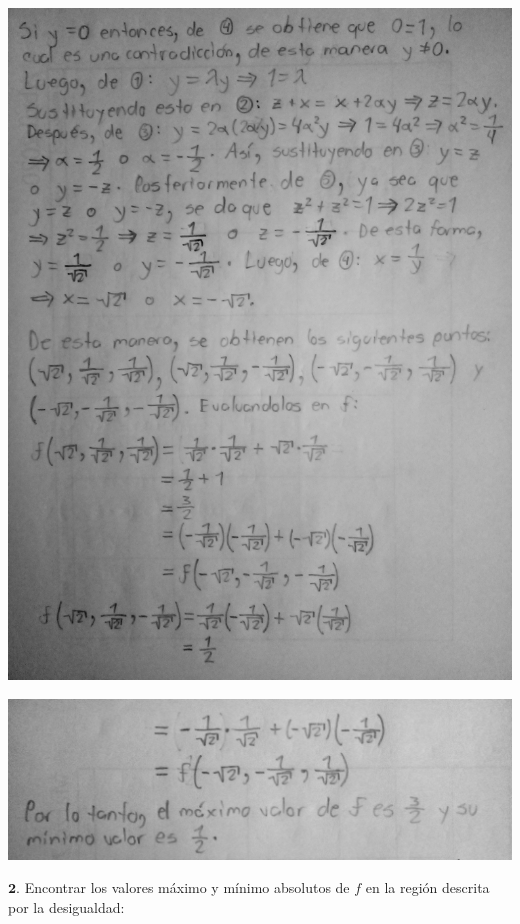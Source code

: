 \documentclass[fleqn, 12pt]{article}
\begin{document}
\begin{list}{\bfseries Ejercicio}{ \addtolength{\itemindent}{-1mm}%
    \addtolength{\labelsep}{-1mm}%
    \addtolength{\leftmargin}{-1cm}%
    \addtolength{\labelwidth}{-1cm} }
\begin{enumerate}[a)]
        \includegraphics[width = 1.0\linewidth]{Ejercicio e2.jpg}
       
        \includegraphics[width = 1.0\linewidth]{Ejercicio e3.jpg}
    \end{enumerate}

    \normalfont
    \item $ \mathbf{2.} $ Encontrar los valores máximo y mínimo absolutos de $ f $ en la región descrita por la desigualdad:
    

\end{list}
\end{document}
